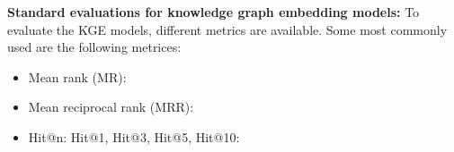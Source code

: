 
\textbf{Standard evaluations for knowledge graph embedding models:}
To evaluate the \ac{KGE} models, different metrics are available.
Some most commonly used are the following metrices:
\begin{itemize}
    \item 
    Mean rank (MR):

    \item 
    Mean reciprocal rank (MRR):
    
    \item 
    Hit@n: Hit@1, Hit@3, Hit@5, Hit@10:
\end{itemize}

%    
%    
%    












